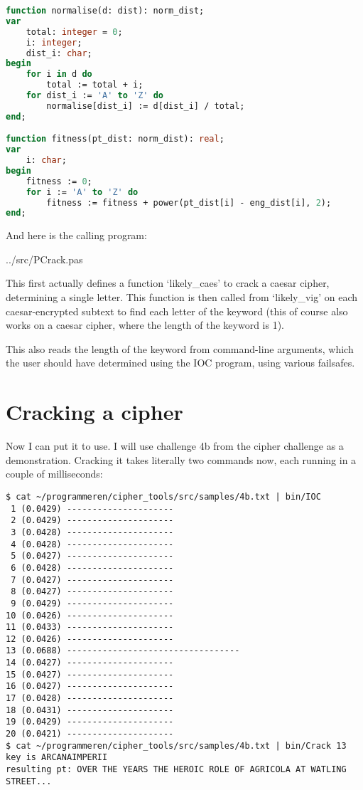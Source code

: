 \documentclass[fleqn,a4paper,11pt]{article}
\begin{document}
\begin{lstlisting}[language=Pascal, caption=Fitness library functions]
function normalise(d: dist): norm_dist;
var
    total: integer = 0;
    i: integer;
    dist_i: char;
begin
    for i in d do
        total := total + i;
    for dist_i := 'A' to 'Z' do
        normalise[dist_i] := d[dist_i] / total;
end;

function fitness(pt_dist: norm_dist): real;
var
    i: char;
begin
    fitness := 0;
    for i := 'A' to 'Z' do
        fitness := fitness + power(pt_dist[i] - eng_dist[i], 2);
end;
\end{lstlisting}

    And here is the calling program:


{../src/PCrack.pas}

    This first actually defines a function `likely\_caes' to crack a caesar
    cipher, determining a single letter. This function is then called from
    `likely\_vig' on each caesar-encrypted subtext to find each letter of the
    keyword (this of course also works on a caesar cipher, where the length of
    the keyword is 1).

    This also reads the length of the keyword from command-line arguments,
    which the user should have determined using the IOC program, using various
    failsafes.

    \section{Cracking a cipher}

    Now I can put it to use. I will use challenge 4b from the cipher challenge
    as a demonstration. Cracking it takes literally two commands now, each
    running in a couple of milliseconds:

\begin{lstlisting}[caption=Cracking 4b, label={lst:iocchart}]
$ cat ~/programmeren/cipher_tools/src/samples/4b.txt | bin/IOC
 1 (0.0429) ---------------------
 2 (0.0429) ---------------------
 3 (0.0428) ---------------------
 4 (0.0428) ---------------------
 5 (0.0427) ---------------------
 6 (0.0428) ---------------------
 7 (0.0427) ---------------------
 8 (0.0427) ---------------------
 9 (0.0429) ---------------------
10 (0.0426) ---------------------
11 (0.0433) ---------------------
12 (0.0426) ---------------------
13 (0.0688) ----------------------------------
14 (0.0427) ---------------------
15 (0.0427) ---------------------
16 (0.0427) ---------------------
17 (0.0428) ---------------------
18 (0.0431) ---------------------
19 (0.0429) ---------------------
20 (0.0421) ---------------------
$ cat ~/programmeren/cipher_tools/src/samples/4b.txt | bin/Crack 13
key is ARCANAIMPERII
resulting pt: OVER THE YEARS THE HEROIC ROLE OF AGRICOLA AT WATLING STREET...
\end{lstlisting}
\end{document}
